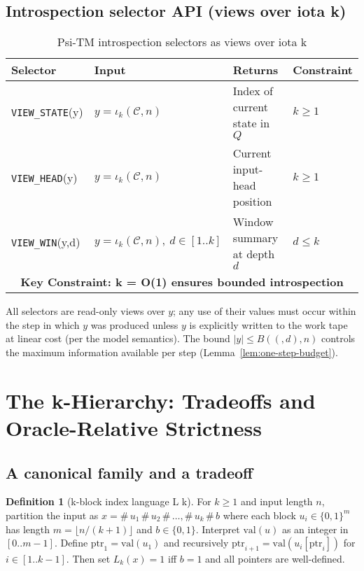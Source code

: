 \documentclass[11pt]{article}
\let\oldlog\log
\renewcommand{\log}{\oldlog_2}
\theoremstyle{plain}
\theoremstyle{definition}
\newtheorem{definition}[theorem]{Definition}
\newcommand{\bits}{\{0,1\}}
\newcommand{\B}[2]{B(#1,#2)}  %
\begin{document}
\subsection{Introspection selector API (views over iota k)}

\begin{table}[ht]
\centering
\caption{Psi-TM introspection selectors as views over iota k}
\label{tab:introspection-api}
\begin{tabular}{|l|l|l|l|}
\hline
\textbf{Selector} & \textbf{Input} & \textbf{Returns} & \textbf{Constraint} \\
\hline
\texttt{VIEW\_STATE}(y) & $y=\iota_k(\mathcal{C},n)$ & Index of current state in $Q$ & $k \ge 1$ \\
\hline
\texttt{VIEW\_HEAD}(y) & $y=\iota_k(\mathcal{C},n)$ & Current input-head position & $k \ge 1$ \\
\hline
\texttt{VIEW\_WIN}(y,d) & $y=\iota_k(\mathcal{C},n),\ d\in[1..k]$ & Window summary at depth $d$ & $d \le k$ \\
\hline
\multicolumn{4}{|c|}{\textbf{Key Constraint: k = O(1) ensures bounded introspection}} \\
\hline
\end{tabular}
\end{table}

All selectors are read-only views over $y$; any use of their values must occur within the step in which $y$ was produced unless $y$ is explicitly written to the work tape at linear cost (per the model semantics). The bound $|y|\le \B(d,n)$ controls the maximum information available per step (Lemma~\ref{lem:one-step-budget}).


\section{The k-Hierarchy: Tradeoffs and Oracle-Relative Strictness}

\subsection{A canonical family and a tradeoff}

\begin{definition}[k-block index language L k]
\label{def:Lk}
For $k\ge1$ and input length $n$, partition the input as $x=\#\,u_1\,\#\,u_2\,\#\,\ldots,\#\,u_k\,\#\,b$ where each block $u_i\in\bits^{m}$ has length $m=\lfloor n/(k{+}1)\rfloor$ and $b\in\bits$. Interpret $\mathrm{val}(u)$ as an integer in $[0..m{-}1]$. Define $\mathrm{ptr}_1=\mathrm{val}(u_1)$ and recursively $\mathrm{ptr}_{i+1}=\mathrm{val}(u_{i}[\mathrm{ptr}_i])$ for $i\in[1..k{-}1]$. Then set $L_k(x)=1$ iff $b=1$ and all pointers are well-defined.
\end{definition}
\end{document}
